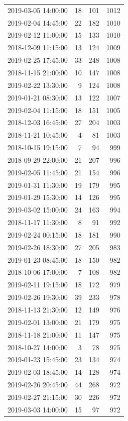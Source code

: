 \begin{tabular}{lrrr}
2019-03-05 14:00:00 & 18 & 101 & 1012 \\
2019-02-04 14:45:00 & 22 & 182 & 1010 \\
2019-02-12 11:00:00 & 15 & 133 & 1010 \\
2018-12-09 11:15:00 & 13 & 124 & 1009 \\
2019-02-25 17:45:00 & 33 & 248 & 1008 \\
2018-11-15 21:00:00 & 10 & 147 & 1008 \\
2019-02-22 13:30:00 & 9 & 124 & 1008 \\
2019-01-21 08:30:00 & 13 & 122 & 1007 \\
2019-02-04 11:15:00 & 18 & 151 & 1005 \\
2018-12-03 16:45:00 & 27 & 204 & 1003 \\
2018-11-21 10:45:00 & 4 & 81 & 1003 \\
2018-10-15 19:15:00 & 7 & 94 & 999 \\
2018-09-29 22:00:00 & 21 & 207 & 996 \\
2019-02-05 11:45:00 & 21 & 154 & 996 \\
2019-01-31 11:30:00 & 19 & 179 & 995 \\
2019-01-29 15:30:00 & 14 & 126 & 995 \\
2019-03-02 15:00:00 & 24 & 163 & 994 \\
2018-11-17 11:30:00 & 8 & 91 & 992 \\
2019-02-24 00:15:00 & 18 & 181 & 990 \\
2019-02-26 18:30:00 & 27 & 205 & 983 \\
2019-01-23 08:45:00 & 18 & 150 & 982 \\
2018-10-06 17:00:00 & 7 & 108 & 982 \\
2019-02-11 19:15:00 & 18 & 172 & 979 \\
2019-02-26 19:30:00 & 39 & 233 & 978 \\
2018-11-13 21:30:00 & 12 & 149 & 976 \\
2019-02-01 13:00:00 & 21 & 179 & 975 \\
2018-11-18 21:00:00 & 11 & 147 & 975 \\
2018-10-27 14:00:00 & 3 & 78 & 975 \\
2019-01-23 15:45:00 & 23 & 134 & 974 \\
2019-02-03 18:45:00 & 14 & 128 & 974 \\
2019-02-26 20:45:00 & 44 & 268 & 972 \\
2019-02-27 21:15:00 & 30 & 226 & 972 \\
2019-03-03 14:00:00 & 15 & 97 & 972 \\

\end{tabular}

